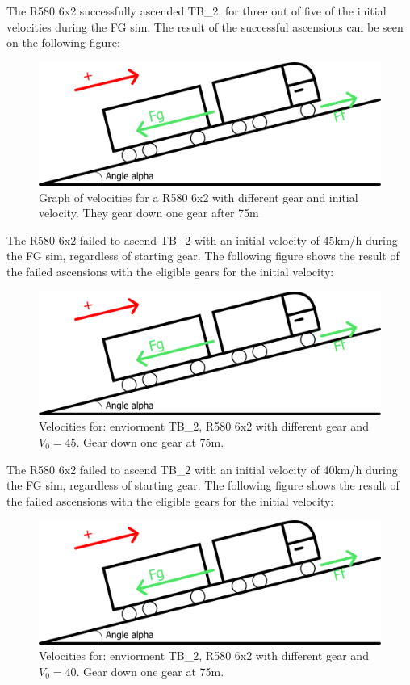 \documentclass[noprint]{uit-thesis}
\begin{document}
The R580 6x2 successfully ascended TB\_2, for three out of five of the initial velocities during the FG sim. The result of the successful ascensions can be seen on the following figure:
\begin{figure}[H]
\includegraphics[width=\textwidth, height=0.45\textheight]{photo/freeBodyDiagram.png}
\caption{Graph of velocities for a R580 6x2 with different gear and initial velocity. They gear down one gear after 75m}
\label{fig:TB26x2GR}
\end{figure}

The R580 6x2 failed to ascend TB\_2 with an initial velocity of 45km/h during the FG sim, regardless of starting gear. The following figure shows the result of the failed ascensions with the eligible gears for the initial velocity:
\begin{figure}[H]
\includegraphics[width=\textwidth, height=0.37\textheight]{photo/freeBodyDiagram.png}
\caption{Velocities for: enviorment TB\_2, R580 6x2 with different gear and $V_0 = 45$. Gear down one gear at 75m.}
\label{fig:TB2_6x2_45}
\end{figure}

The R580 6x2 failed to ascend TB\_2 with an initial velocity of 40km/h during the FG sim, regardless of starting gear. The following figure shows the result of the failed ascensions with the eligible gears for the initial velocity:
\begin{figure}[H]
\includegraphics[width=\textwidth, height=0.37\textheight]{photo/freeBodyDiagram.png}
\caption{Velocities for: enviorment TB\_2, R580 6x2 with different gear and $V_0 = 40$. Gear down one gear at 75m.}
\label{fig:TB2_6x2_40}
\end{figure}
\end{document}

